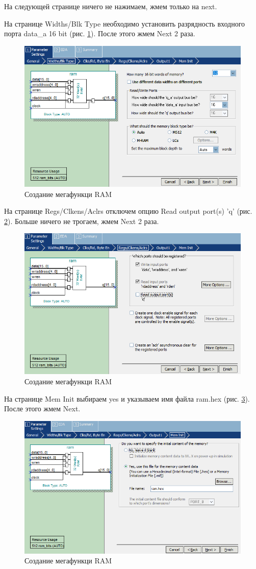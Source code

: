 \documentclass[a4paper,14pt]{article}
\begin{document}
На следующей странице ничего не нажимаем, жмем только на next.

На странице Widths/Blk Type необходимо установить разрядность входного порта data\_a 16 bit (рис. \ref{fig:screenshot005}). После этого жмем Next 2 раза.

\begin{figure}[H]
	\centering
	\includegraphics[width=0.7\linewidth]{image/lab5/screenshot005}
	\caption{Создание мегафункци RAM}
	\label{fig:screenshot005}
\end{figure}

На странице Regs/Clkens/Aclrs отключем опцию Read output port(s) 'q' (рис. \ref{fig:screenshot006}). Больше ничего не трогаем, жмем Next 2 раза.

\begin{figure}[H]
	\centering
	\includegraphics[width=0.7\linewidth]{image/lab5/screenshot006}
	\caption{Создание мегафункци RAM}
	\label{fig:screenshot006}
\end{figure}

На странице Mem Init выбираем yes и указываем имя файла ram.hex (рис. \ref{fig:screenshot007}). После этого жмем Next.

\begin{figure}[H]
	\centering
	\includegraphics[width=0.7\linewidth]{image/lab5/screenshot007}
	\caption{Создание мегафункци RAM}
	\label{fig:screenshot007}
\end{figure}
\end{document}
